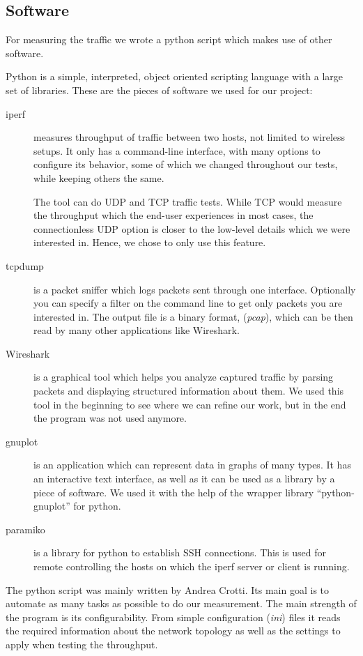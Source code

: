 \subsection{Software} \label{setup:software}



\noindent
For measuring the traffic we wrote a python script which makes use of other software.

Python is a simple, interpreted, object oriented scripting language with a large set of libraries.
These are the pieces of software we used for our project:

\begin{description}
	\item[iperf]
		measures throughput of traffic between two hosts, not limited to wireless setups.
		It only has a command-line interface, with many options to configure its behavior, some of which we changed throughout our tests, while keeping others the same.

		The tool can do UDP and TCP traffic tests.
		While TCP would measure the throughput which the end-user experiences in most cases, the connectionless UDP option is closer to the low-level details which we were interested in. Hence, we chose to only use this feature.


	\item[tcpdump]
		is a packet sniffer which logs packets sent through one interface. Optionally you can specify a filter on the command line to get only packets you are interested in.
		The output file is a binary format, ({\em pcap}), which can be then read by many other applications like Wireshark.
		
	\item[Wireshark]
		is a graphical tool which helps you analyze captured traffic by parsing packets and displaying structured information about them.
		We used this tool in the beginning to see where we can refine our work, but in the end the program was not used anymore.

	\item[gnuplot]
		is an application which can represent data in graphs of many types. It has an interactive text interface, as well as it can be used as a library by a piece of software. We used it with the help of the wrapper library ``python-gnuplot'' for python.

	\item[paramiko]
		is a library for python to establish SSH connections.
		This is used for remote controlling the hosts on which the iperf server or client is running.

\end{description}
%
The python script was mainly written by Andrea Crotti.  Its main goal is to
automate as many tasks as possible to do our measurement.  The main strength
of the program is its configurability.  From simple configuration ({\em ini})
files it reads the required information about the network topology as well as
the settings to apply when testing the throughput.

